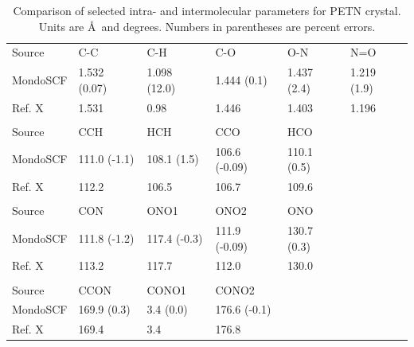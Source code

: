 \documentclass[prb,aps,nobibnotes,twocolumn,doublespace,twocolumngrid,superbib]{revtex4}
\begin{document}
\begin{table}[p]
\begin{center}
\begin{tabular}{llllll}
\hline\hline
Source & C-C & C-H & C-O & O-N & N=O  \\
MondoSCF & 1.532 (0.07) & 1.098 (12.0) & 1.444 (0.1) &  1.437 (2.4) & 1.219 (1.9) \\
Ref. X   &  1.531   &       0.98    &      1.446    &     1.403 &      1.196 \\
\hline
\\
Source  &  CCH   &        HCH     &      CCO    &       HCO \\
MondoSCF & 111.0 (-1.1)  & 108.1  (1.5) &  106.6 (-0.09) & 110.1 (0.5) \\
Ref. X   &  112.2        &  106.5       &  106.7         & 109.6 \\
\hline
\\
Source   &  CON     &       ONO1   &        ONO2     &      ONO \\
MondoSCF&  111.8 (-1.2) &  117.4 (-0.3)&  111.9 (-0.09)&  130.7 (0.3)\\
Ref. X &    113.2   &       117.7   &       112.0   &       130.0\\
\hline\\
Source &    CCON    &       CONO1   &       CONO2\\
MondoSCF &  169.9 (0.3) &   3.4 (0.0) &     176.6 (-0.1)\\
Ref. X  &   169.4   &       3.4     &       176.8\\
\hline\hline
\end{tabular}
\end{center}
\caption{Comparison of selected intra- and intermolecular parameters for
PETN crystal.  Units are \AA\ and degrees.  Numbers in parentheses
are percent errors.
}
\label{tab:table2}
\end{table}
\end{document}
